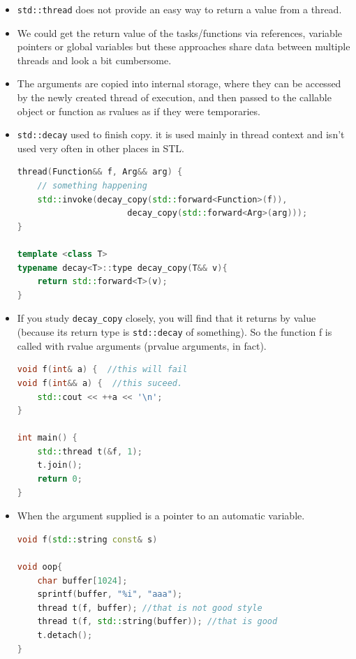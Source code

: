 \documentclass[a4paper,11pt,twoside]{book}
\begin{document}
\begin{itemize}
	\item \texttt{std::thread} does not provide an easy way to return a value from a thread.
	
	\item We could get the return value of the tasks/functions via references, variable pointers or global variables but these approaches share data between multiple threads and look a bit cumbersome.
	
	\item The arguments are copied into internal storage, where they can be accessed by the newly created thread of execution, and then passed to the callable object or function as rvalues as if they were temporaries.
	
	\item \texttt{std::decay} used to finish copy. it is used mainly in thread context and isn't used very often in other places in STL.
	
\begin{lstlisting}[frame=single, language=c++]
thread(Function&& f, Arg&& arg) {
	// something happening
	std::invoke(decay_copy(std::forward<Function>(f)),
	                  decay_copy(std::forward<Arg>(arg)));
}
	
template <class T> 
typename decay<T>::type decay_copy(T&& v){
	return std::forward<T>(v); 
}
\end{lstlisting}

	\item  If you study \texttt{decay\_copy} closely, you will find that it returns by value (because its return type is \texttt{std::decay} of something). So the function f is called with rvalue arguments (prvalue arguments, in fact).

\begin{lstlisting}[frame=single, language=c++]
void f(int& a) {  //this will fail
void f(int&& a) {  //this suceed.
	std::cout << ++a << '\n';
}

int main() {
	std::thread t(&f, 1);
	t.join();
	return 0;
}
\end{lstlisting}

		\item When the argument supplied is a pointer to an automatic variable.
\begin{lstlisting}[frame=single, language=c++]
void f(std::string const& s)
	
void oop{
	char buffer[1024];
	sprintf(buffer, "%i", "aaa");
	thread t(f, buffer); //that is not good style
	thread t(f, std::string(buffer)); //that is good
    t.detach();
}
\end{lstlisting}	


\end{itemize}
\end{document}
